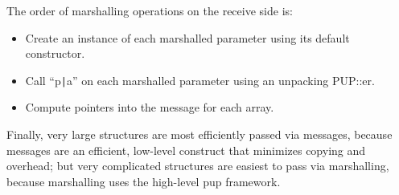 The order of marshalling operations on the receive side is:
\begin{itemize}
\item Create an instance of each marshalled parameter using its default constructor.
\item Call ``p\verb.|.a'' on each marshalled parameter using an unpacking PUP::er.
\item Compute pointers into the message for each array.
\end{itemize}

Finally, very large structures are most efficiently passed via messages,
because messages are an efficient, low-level construct that minimizes copying
and overhead; but very complicated structures are easiest to pass via 
marshalling, because marshalling uses the high-level pup framework.
